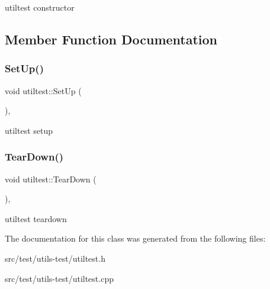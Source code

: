 utiltest constructor 

\subsection{Member Function Documentation}
\mbox{\label{classutiltest_afc8b4a31b759240caba5c944d67da4f3}} 
\subsubsection{\texorpdfstring{Set\+Up()}{SetUp()}}
{\footnotesize\ttfamily void utiltest\+::\+Set\+Up (\begin{DoxyParamCaption}{ }\end{DoxyParamCaption})\hspace{0.3cm}{\ttfamily [protected]}, {\ttfamily [virtual]}}

utiltest setup \mbox{\label{classutiltest_afadabc73c18bc9ea33a199f32b296c62}} 
\subsubsection{\texorpdfstring{Tear\+Down()}{TearDown()}}
{\footnotesize\ttfamily void utiltest\+::\+Tear\+Down (\begin{DoxyParamCaption}{ }\end{DoxyParamCaption})\hspace{0.3cm}{\ttfamily [protected]}, {\ttfamily [virtual]}}

utiltest teardown 

The documentation for this class was generated from the following files\+:\begin{DoxyCompactItemize}
\item 
src/test/utils-\/test/utiltest.\+h\item 
src/test/utils-\/test/utiltest.\+cpp\end{DoxyCompactItemize}
